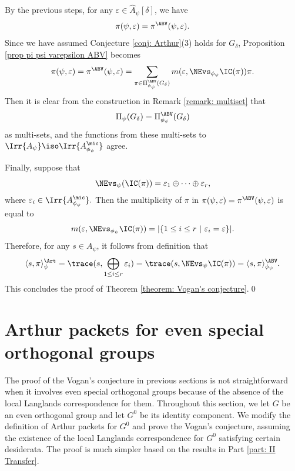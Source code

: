 \documentclass[11pt,letterpaper]{amsart}
\numberwithin{equation}{section}
\begin{document}
By the previous steps, for any  $\varepsilon \in \widehat{A}_{\psi}[\delta]$, we have 
\[ \pi(\psi, \varepsilon)= \pi^{\ABV}(\psi, \varepsilon).\]
Since we have assumed Conjecture \ref{conj: Arthur}(3) holds for $G_{\delta}$, Proposition \ref{prop pi psi varepsilon ABV} becomes 
\[\pi(\psi, \varepsilon)= \pi^{\ABV}(\psi, \varepsilon)=\sum_{\pi \in \Pi_{\phi_{\psi}}^{\ABV}(G_{\delta})}  m(\varepsilon, \NEvs_{\phi_{\psi}}\IC(\pi))  \pi. \]
Then it is clear from the construction in Remark \ref{remark: multiset} that 
\[ \Pi_{\psi}(G_{\delta})= \Pi_{\phi_{\psi}}^{\ABV}(G_{\delta})\]
as multi-sets, and the functions from these multi-sets to $\Irr{A_{\psi}} \iso \Irr{A_{\phi_{\psi}}^{\mic}}$ agree.

Finally, suppose that 
\[ \NEvs_{\psi}(\IC(\pi))= \varepsilon_1 \oplus \cdots \oplus \varepsilon_r,\]
where $\varepsilon_i \in \Irr{A_{\phi_{\psi}}^{\mic}}.$ 
Then the multiplicity of $\pi$ in $\pi(\psi,\varepsilon)=\pi^{\ABV}(\psi, \varepsilon)$ is equal to
\[m(\varepsilon, \NEvs_{\phi_{\psi}}\IC(\pi))= | \{1 \leq i \leq r \ | \ \varepsilon_i= \varepsilon\}|. \]
Therefore, for any $s \in A_{\psi}$, it follows from definition that
\[ \langle s, \pi \rangle_{\psi}^{\Art}= \trace(s, \bigoplus_{1\leq i\leq r}\varepsilon_i)= \trace(s,\NEvs_{\psi}\IC(\pi))=   \langle s, \pi \rangle_{\phi_\psi}^{\ABV}. \]
This concludes the proof of Theorem \ref{theorem: Vogan's conjecture}.\qed





\section{Arthur packets for even special orthogonal groups}

The proof of the Vogan's conjecture in previous sections is not straightforward when it involves even special orthogonal groups because of the absence of the local Langlands correspondence for them.
Throughout this section, we let $G$ be an even orthogonal group and let $G^0$ be its identity component. We modify the definition of Arthur packets for $G^0$ and prove the Vogan's conjecture, assuming the existence of the local Langlands correspondence for $G^0$ satisfying certain desiderata. The proof is much simpler based on the results in Part \ref{part: II Transfer}.
\end{document}
